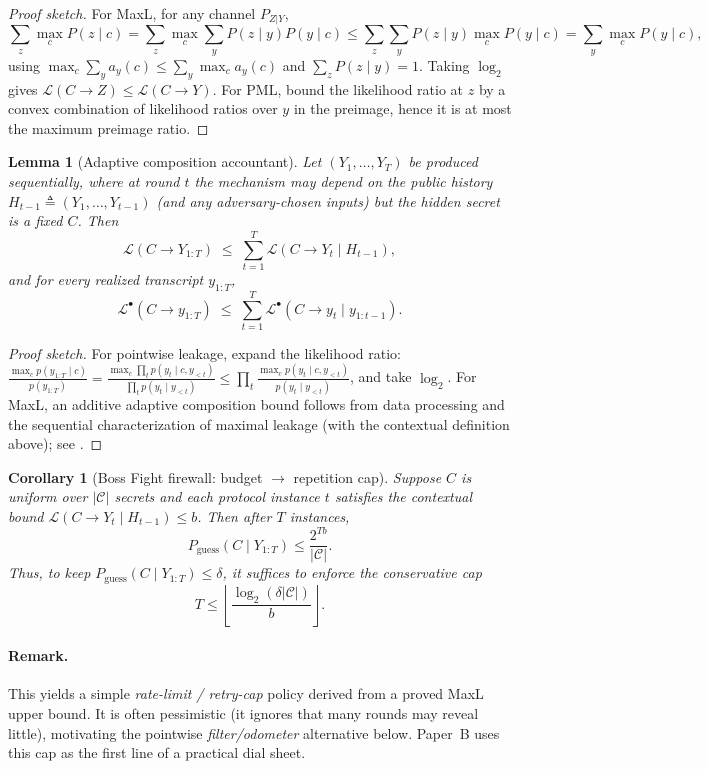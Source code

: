 \documentclass[11pt]{article}
\newcommand{\MaxL}{\mathcal{L}}
\newcommand{\PML}{\mathcal{L}^{\bullet}}
\newcommand{\logtwo}{\log_2}
\newcommand{\C}{\mathcal{C}} %
\newtheorem{lemma}{Lemma}
\newtheorem{corollary}{Corollary}
\begin{document}
\begin{proof}[Proof sketch]
For MaxL, for any channel $P_{Z|Y}$,
\[
\sum_z \max_c P(z\mid c)
=\sum_z \max_c \sum_y P(z\mid y)P(y\mid c)
\le \sum_z \sum_y P(z\mid y)\max_c P(y\mid c)
= \sum_y \max_c P(y\mid c),
\]
using $\max_c\sum_y a_y(c)\le \sum_y \max_c a_y(c)$ and $\sum_z P(z\mid y)=1$.
Taking $\logtwo$ gives $\MaxL(C\!\to\!Z)\le \MaxL(C\!\to\!Y)$.
For PML, bound the likelihood ratio at $z$ by a convex combination of likelihood ratios over $y$ in the preimage, hence it is at most the maximum preimage ratio.
\end{proof}


\begin{lemma}[Adaptive composition accountant]\label{lem:adaptive}
Let $(Y_1,\dots,Y_T)$ be produced sequentially, where at round $t$ the mechanism may depend on the public history $H_{t-1}\triangleq (Y_1,\dots,Y_{t-1})$ (and any adversary-chosen inputs) but the hidden secret is a fixed $C$.
Then
\[
\MaxL(C\!\to\!Y_{1:T}) \;\le\; \sum_{t=1}^{T}\MaxL(C\!\to\!Y_t \mid H_{t-1}),
\]
and for every realized transcript $y_{1:T}$,
\[
\PML(C\!\to\!y_{1:T}) \;\le\; \sum_{t=1}^{T}\PML(C\!\to\!y_t \mid y_{1:t-1}).
\]
\end{lemma}
\begin{proof}[Proof sketch]
For pointwise leakage, expand the likelihood ratio:
$\frac{\max_c p(y_{1:T}\mid c)}{p(y_{1:T})}
=\frac{\max_c \prod_t p(y_t\mid c,y_{<t})}{\prod_t p(y_t\mid y_{<t})}
\le \prod_t \frac{\max_c p(y_t\mid c,y_{<t})}{p(y_t\mid y_{<t})}$,
and take $\logtwo$.
For MaxL, an additive adaptive composition bound follows from data processing and the sequential characterization of maximal leakage (with the contextual definition above); see \cite{issa2020operational,issa2022adaptive,saeidian2023pml}.
\end{proof}

\begin{corollary}[Boss Fight firewall: budget $\rightarrow$ repetition cap]\label{cor:firewall}
Suppose $C$ is uniform over $|\C|$ secrets and each protocol instance $t$ satisfies the contextual bound $\MaxL(C\!\to\!Y_t\mid H_{t-1})\le b$.
Then after $T$ instances,
\[
P_{\mathrm{guess}}(C\mid Y_{1:T})\le \frac{2^{Tb}}{|\C|}.
\]
Thus, to keep $P_{\mathrm{guess}}(C\mid Y_{1:T})\le \delta$, it suffices to enforce the conservative cap
\[
T \le \left\lfloor \frac{\logtwo(\delta|\C|)}{b}\right\rfloor.
\]
\end{corollary}

\paragraph{Remark.}
This yields a simple \emph{rate-limit / retry-cap} policy derived from a proved MaxL upper bound.
It is often pessimistic (it ignores that many rounds may reveal little), motivating the pointwise \emph{filter/odometer} alternative below.
Paper~B uses this cap as the first line of a practical dial sheet.
\end{document}
